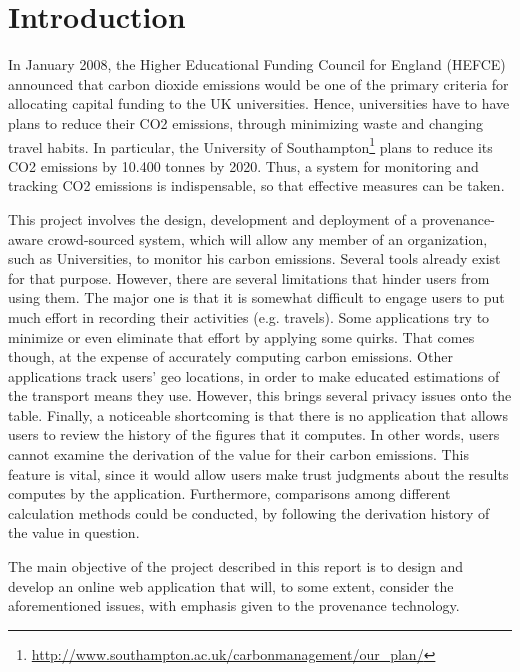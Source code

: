 
\chapter{Introduction} %
\label{Introduction}

In January 2008, the Higher Educational Funding Council for England (HEFCE) announced that carbon dioxide emissions would be one of the primary criteria for allocating capital funding to the UK universities. Hence, universities have to have plans to reduce their CO2 emissions, through minimizing waste and changing travel habits. In particular, the University of Southampton\footnote{\url{http://www.southampton.ac.uk/carbonmanagement/our_plan/}} plans to reduce its CO2 emissions by 10.400 tonnes by 2020. Thus, a system for monitoring and tracking CO2 emissions is indispensable, so that effective measures can be taken.

This project involves the design, development and deployment of a provenance-aware crowd-sourced system, which will allow any member of an organization, such as Universities, to monitor his carbon emissions. Several tools already exist for that purpose. However, there are several limitations that hinder users from using them. The major one is that it is somewhat difficult to engage users to put much effort in recording their activities (e.g. travels). Some applications try to minimize or even eliminate that effort by applying some quirks. That comes though, at the expense of accurately computing carbon emissions. Other applications track users' geo locations, in order to make educated estimations of the transport means they use. However, this brings several privacy issues onto the table. Finally, a noticeable shortcoming is that there is no application that allows users to review the history of the figures that it computes. In other words, users cannot examine the derivation of the value for their carbon emissions. This feature is vital, since it would allow users make trust judgments about the results computes by the application. Furthermore, comparisons among different calculation methods could be conducted, by following the derivation history of the value in question.

The main objective of the project described in this report is to design and develop an online web application that will, to some extent, consider the aforementioned issues, with emphasis given to the provenance technology.

